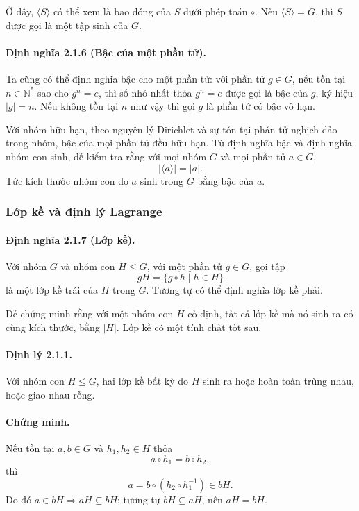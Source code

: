 \documentclass[11pt]{article}
\begin{document}
Ở đây, \(\langle S\rangle\) có thể xem là bao đóng của \(S\) dưới phép toán
\(\circ\). Nếu \(\langle S\rangle=G\), thì \(S\) được gọi là một tập sinh của
\(G\).

\paragraph{Định nghĩa 2.1.6 (Bậc của một phần tử).}
Ta cũng có thể định nghĩa bậc cho một phần tử: với phần tử \(g\in G\), nếu tồn
tại \(n\in\mathbb{N}^*\) sao cho \(g^n=e\), thì số nhỏ nhất thỏa \(g^n=e\) được
gọi là bậc của \(g\), ký hiệu \(|g|=n\). Nếu không tồn tại \(n\) như vậy thì
gọi \(g\) là phần tử có bậc vô hạn.

Với nhóm hữu hạn, theo nguyên lý Dirichlet và sự tồn tại phần tử nghịch đảo
trong nhóm, bậc của mọi phần tử đều hữu hạn. Từ định nghĩa bậc và định nghĩa
nhóm con sinh, dễ kiểm tra rằng với mọi nhóm \(G\) và mọi phần tử \(a\in G\),
\[
  |\langle a\rangle|=|a|.
\]
Tức kích thước nhóm con do \(a\) sinh trong \(G\) bằng bậc của \(a\).

\subsubsection{Lớp kề và định lý Lagrange}

\paragraph{Định nghĩa 2.1.7 (Lớp kề).}
Với nhóm \(G\) và nhóm con \(H\le G\), với một phần tử \(g\in G\), gọi tập
\[
  gH=\{g\circ h\mid h\in H\}
\]
là một lớp kề trái của \(H\) trong \(G\). Tương tự có thể định nghĩa lớp kề
phải.

Dễ chứng minh rằng với một nhóm con \(H\) cố định, tất cả lớp kề mà nó sinh ra
có cùng kích thước, bằng \(|H|\). Lớp kề có một tính chất tốt sau.

\paragraph{Định lý 2.1.1.}
Với nhóm con \(H\le G\), hai lớp kề bất kỳ do \(H\) sinh ra hoặc hoàn toàn
trùng nhau, hoặc giao nhau rỗng.

\paragraph{Chứng minh.}
Nếu tồn tại \(a,b\in G\) và \(h_1,h_2\in H\) thỏa
\[
  a\circ h_1=b\circ h_2,
\]
thì
\[
  a=b\circ(h_2\circ h_1^{-1})\in bH.
\]
Do đó \(a\in bH\Rightarrow aH\subseteq bH\); tương tự \(bH\subseteq aH\), nên
\(aH=bH\).
\end{document}
